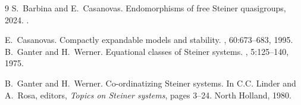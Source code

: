 \documentclass[10pt,a4paper]{article}
\theoremstyle{note}
\begin{document}
\begin{thebibliography}{9}
S.~Barbina and E.~Casanovas.
\newblock Endomorphisms of free {S}teiner quasigroups, 2024.
.

E.~Casanovas.
\newblock Compactly expandable models and stability.
, 60:673--683, 1995.
B.~Ganter and H.~Werner.
\newblock Equational classes of {S}teiner systems.
, 5:125--140, 1975.

B.~Ganter and H.~Werner.
\newblock Co-ordinatizing {S}teiner systems.
\newblock In C.C. Linder and A.~Rosa, editors, {\em Topics on {S}teiner
  systems}, pages 3--24. North Holland, 1980.
\end{thebibliography}
\end{document}
